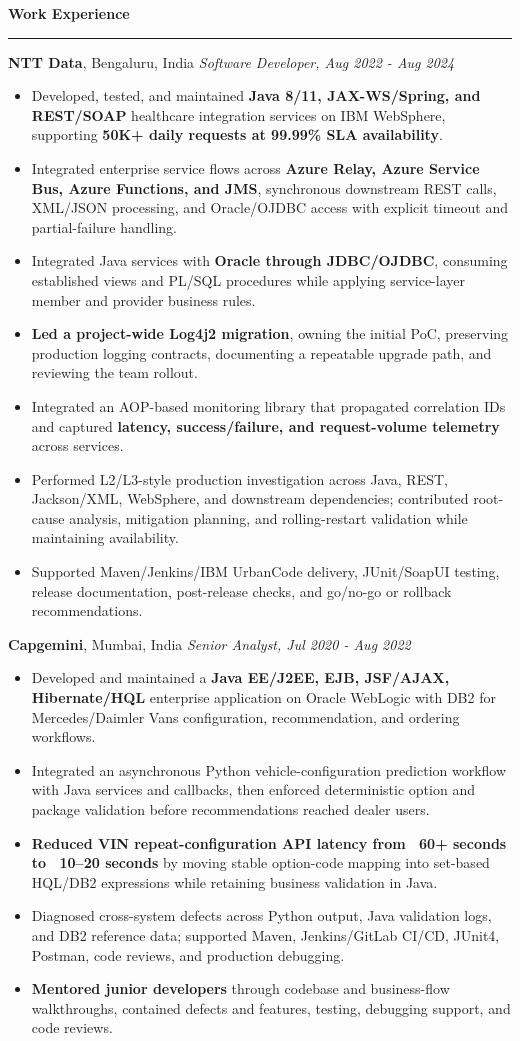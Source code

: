 \documentclass[11pt,letterpaper]{article}
\newcommand{\ressection}[1]{\Needspace{6\baselineskip}\vspace{8pt}\par\textbf{#1}\par\vspace{2pt}\hrule\vspace{5pt}}
\begin{document}
\ressection{Work Experience}
\textbf{NTT Data}, Bengaluru, India \hfill \textit{Software Developer, Aug 2022 - Aug 2024}
\begin{itemize}
  \item Developed, tested, and maintained \textbf{Java 8/11, JAX-WS/Spring, and REST/SOAP} healthcare integration services on IBM WebSphere, supporting \textbf{50K+ daily requests at 99.99\% SLA availability}.
  \item Integrated enterprise service flows across \textbf{Azure Relay, Azure Service Bus, Azure Functions, and JMS}, synchronous downstream REST calls, XML/JSON processing, and Oracle/OJDBC access with explicit timeout and partial-failure handling.
  \item Integrated Java services with \textbf{Oracle through JDBC/OJDBC}, consuming established views and PL/SQL procedures while applying service-layer member and provider business rules.
  \item \textbf{Led a project-wide Log4j2 migration}, owning the initial PoC, preserving production logging contracts, documenting a repeatable upgrade path, and reviewing the team rollout.
  \item Integrated an AOP-based monitoring library that propagated correlation IDs and captured \textbf{latency, success/failure, and request-volume telemetry} across services.
  \item Performed L2/L3-style production investigation across Java, REST, Jackson/XML, WebSphere, and downstream dependencies; contributed root-cause analysis, mitigation planning, and rolling-restart validation while maintaining availability.
  \item Supported Maven/Jenkins/IBM UrbanCode delivery, JUnit/SoapUI testing, release documentation, post-release checks, and go/no-go or rollback recommendations.
\end{itemize}
\textbf{Capgemini}, Mumbai, India \hfill \textit{Senior Analyst, Jul 2020 - Aug 2022}
\begin{itemize}
  \item Developed and maintained a \textbf{Java EE/J2EE, EJB, JSF/AJAX, Hibernate/HQL} enterprise application on Oracle WebLogic with DB2 for Mercedes/Daimler Vans configuration, recommendation, and ordering workflows.
  \item Integrated an asynchronous Python vehicle-configuration prediction workflow with Java services and callbacks, then enforced deterministic option and package validation before recommendations reached dealer users.
  \item \textbf{Reduced VIN repeat-configuration API latency from ~60+ seconds to ~10--20 seconds} by moving stable option-code mapping into set-based HQL/DB2 expressions while retaining business validation in Java.
  \item Diagnosed cross-system defects across Python output, Java validation logs, and DB2 reference data; supported Maven, Jenkins/GitLab CI/CD, JUnit4, Postman, code reviews, and production debugging.
  \item \textbf{Mentored junior developers} through codebase and business-flow walkthroughs, contained defects and features, testing, debugging support, and code reviews.
\end{itemize}
\end{document}
